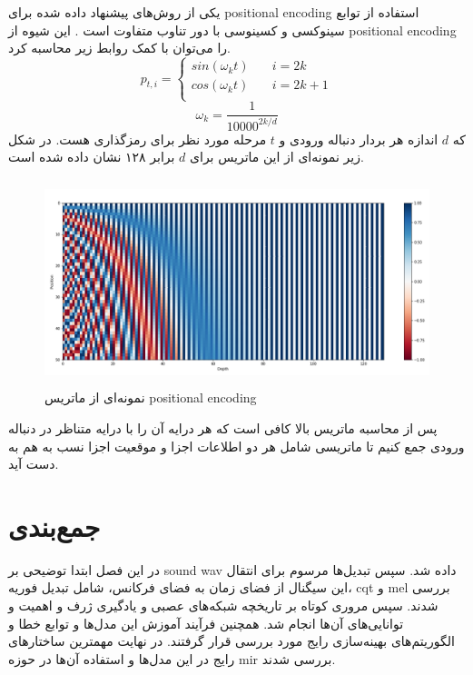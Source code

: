یکی از روش‌های پیشنهاد داده شده برای \gls{positional encoding} استفاده از توابع
سینوکسی و کسینوسی با دور تناوب متفاوت است \cite{vaswani2017attention}. این شیوه
از \gls{positional encoding} را می‌توان با کمک روابط زیر محاسبه کرد.
\begin{equation}
    p_{t, i} =
    \begin{cases}
        sin(\omega_k t) &\quad i = 2k\\
        cos(\omega_k t) &\quad i = 2k+1\\
    \end{cases}
\end{equation}
\begin{equation}
    \omega_k = \frac{1}{10000^{2k/d}}
\end{equation}
که $d$ اندازه هر بردار دنباله ورودی و $t$ مرحله مورد نظر برای رمزگذاری هست. در
شکل زیر نمونه‌ای از این ماتریس برای $d$ برابر ۱۲۸ نشان داده شده است.
\begin{figure}[ht]
    \centering
    \includegraphics[height=6cm]{./statics/positional_encoding.png}
    \caption{نمونه‌ای از ماتریس \gls{positional encoding}}
\end{figure}

پس از محاسبه ماتریس بالا کافی است که هر درایه آن را با درایه متناظر در دنباله
ورودی جمع کنیم تا ماتریسی شامل هر دو اطلاعات اجزا و موقعیت اجزا نسب به هم به دست
آید.

\section{جمع‌بندی}
در این فصل ابتدا توضیحی بر \gls{sound wav} داده شد. سپس تبدیل‌ها مرسوم برای
انتقال این سیگنال از فضای زمان به فضای فرکانس، شامل تبدیل فوریه، \gls{cqt} و mel
بررسی شدند. سپس مروری کوتاه بر تاریخچه شبکه‌های عصبی و یادگیری ژرف و اهمیت و
توانایی‌های آن‌ها انجام شد. همچنین فرآیند آموزش این مدل‌ها و توابع خطا و
الگوریتم‌های بهینه‌سازی رایج مورد بررسی قرار گرفتند. در نهایت مهمترین ساختارهای
رایج در این مدل‌ها و استفاده آن‌ها در حوزه \gls{mir} بررسی شدند.